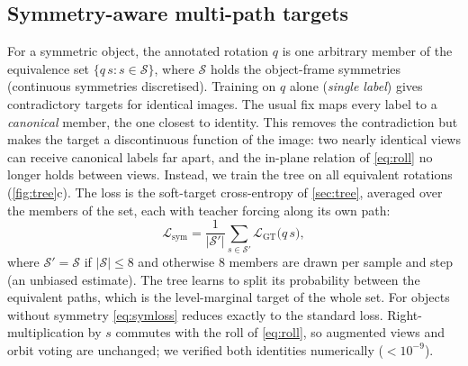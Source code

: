 \subsection{Symmetry-aware multi-path targets}
\label{sec:symtarget}
For a symmetric object, the annotated rotation $q$ is one arbitrary member of the equivalence set $\{q\,s : s\in\mathcal{S}\}$, where $\mathcal{S}$ holds the object-frame symmetries (continuous symmetries discretised). Training on $q$ alone (\emph{single label}) gives contradictory targets for identical images. The usual fix maps every label to a \emph{canonical} member, \eg the one closest to identity. This removes the contradiction but makes the target a discontinuous function of the image: two nearly identical views can receive canonical labels far apart, and the in-plane relation of \cref{eq:roll} no longer holds between views.
Instead, we train the tree on all equivalent rotations (\cref{fig:tree}c). The loss is the soft-target cross-entropy of \cref{sec:tree}, averaged over the members of the set, each with teacher forcing along its own path:
\begin{equation}
  \mathcal{L}_{\text{sym}}=\frac{1}{|\mathcal{S}'|}\sum_{s\in\mathcal{S}'}\mathcal{L}_{\text{GT}}\big(q\,s\big),
  \label{eq:symloss}
\end{equation}
where $\mathcal{S}'=\mathcal{S}$ if $|\mathcal{S}|\le 8$ and otherwise 8 members are drawn per sample and step (an unbiased estimate). The tree learns to split its probability between the equivalent paths, which is the level-marginal target of the whole set. For objects without symmetry \cref{eq:symloss} reduces exactly to the standard loss. Right-multiplication by $s$ commutes with the roll of \cref{eq:roll}, so augmented views and orbit voting are unchanged; we verified both identities numerically ($<10^{-9}$).


